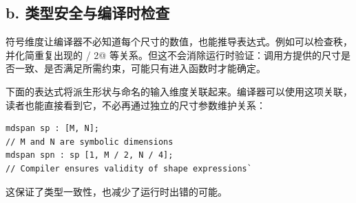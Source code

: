 \subsection*{\textbf{b. 类型安全与编译时检查}}

符号维度让编译器不必知道每个尺寸的数值，也能推导表达式。例如可以检查秩，并化简重复出现的 \co@M / 2@ 等关系。但这不会消除运行时验证：调用方提供的尺寸是否一致、是否满足所需约束，可能只有进入函数时才能确定。

下面的表达式将派生形状与命名的输入维度关联起来。编译器可以使用这项关联，读者也能直接看到它，不必再通过独立的尺寸参数维护关系：

\begin{lstlisting}[language=croqtile,caption={b. 类型安全与编译时检查}]
mdspan sp : [M, N];
// M and N are symbolic dimensions
mdspan spn : sp [1, M / 2, N / 4];
// Compiler ensures validity of shape expressions`
\end{lstlisting}

这保证了类型一致性，也减少了运行时出错的可能。
